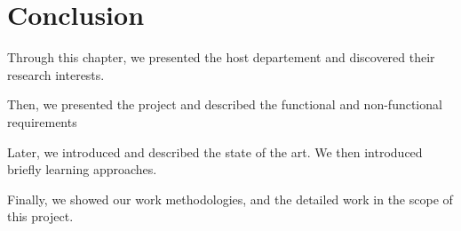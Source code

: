 \section*{Conclusion}
Through this chapter, we presented the host departement and discovered their research interests.

Then, we presented the project and described the functional and non-functional requirements

Later, we introduced  and described the state of the art. We then introduced briefly learning approaches.

Finally, we showed our work methodologies, and the detailed work in the scope of this project.